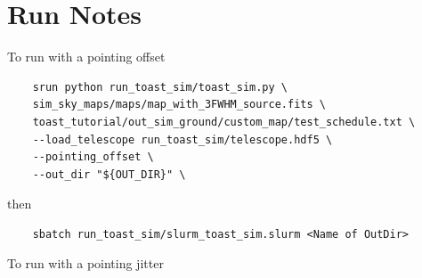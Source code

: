\section{Run Notes}

To run with a pointing offset
\begin{verbatim}
    srun python run_toast_sim/toast_sim.py \
    sim_sky_maps/maps/map_with_3FWHM_source.fits \
    toast_tutorial/out_sim_ground/custom_map/test_schedule.txt \
    --load_telescope run_toast_sim/telescope.hdf5 \
    --pointing_offset \
    --out_dir "${OUT_DIR}" \
\end{verbatim}
then
\begin{verbatim}
    sbatch run_toast_sim/slurm_toast_sim.slurm <Name of OutDir>
\end{verbatim}

To run with a pointing jitter